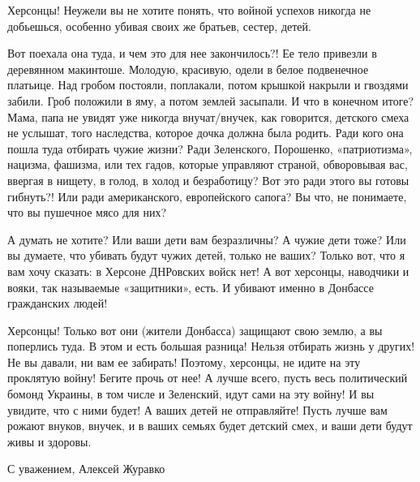 Херсонцы! Неужели вы не хотите понять, что войной успехов никогда не добьешься,
особенно убивая своих же братьев, сестер, детей.

Вот поехала она туда, и чем это для нее закончилось?! Ее тело привезли в
деревянном макинтоше.  Молодую, красивую, одели в белое подвенечное платьице.
Над гробом постояли, поплакали, потом крышкой накрыли и гвоздями забили. Гроб
положили в яму, а потом землей засыпали. И что в конечном итоге? Мама, папа не
увидят уже никогда внучат/внучек, как говорится, детского смеха не услышат,
того наследства, которое дочка должна была родить. Ради кого она пошла туда
отбирать чужие жизни? Ради Зеленского, Порошенко, «патриотизма», нацизма,
фашизма, или тех гадов, которые управляют страной, обворовывая вас, ввергая в
нищету, в голод, в холод и безработицу? Вот это ради этого вы готовы гибнуть?!
Или ради американского, европейского сапога? Вы что, не понимаете, что вы
пушечное мясо для них?

А думать не хотите? Или ваши дети вам безразличны? А чужие дети тоже? Или вы
думаете, что убивать будут чужих детей, только не ваших? Только вот, что я вам
хочу сказать: в Херсоне ДНРовских войск нет! А вот херсонцы, наводчики и вояки,
так называемые «защитники», есть. И убивают именно в Донбассе гражданских
людей!

Херсонцы! Только вот они (жители Донбасса) защищают свою землю, а вы поперлись
туда. В этом и есть большая разница! Нельзя отбирать жизнь у других! Не вы
давали, ни вам ее забирать! Поэтому, херсонцы, не идите на эту проклятую войну!
Бегите прочь от нее! А лучше всего, пусть весь политический бомонд Украины, в
том числе и Зеленский, идут сами на эту войну! И вы увидите,  что с ними будет!
А ваших детей не отправляйте! Пусть лучше вам рожают внуков, внучек, и в ваших
семьях будет детский смех, и ваши дети будут живы и здоровы.

С уважением,    Алексей Журавко
